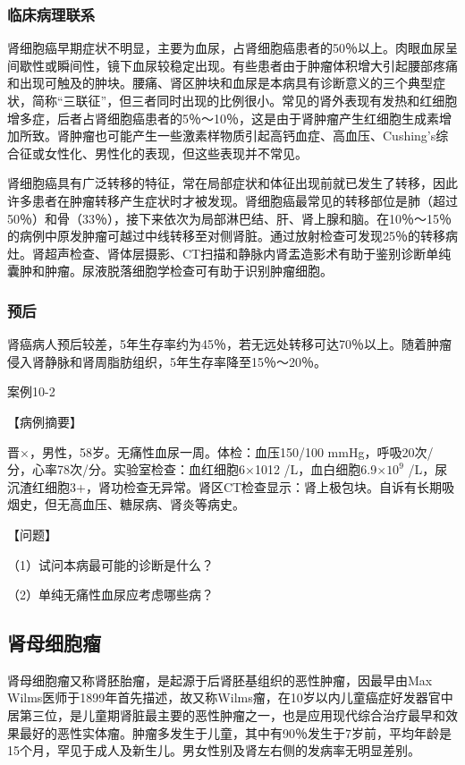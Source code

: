 \subsubsection{临床病理联系}

肾细胞癌早期症状不明显，主要为血尿，占肾细胞癌患者的50％以上。肉眼血尿呈间歇性或瞬间性，镜下血尿较稳定出现。有些患者由于肿瘤体积增大引起腰部疼痛和出现可触及的肿块。腰痛、肾区肿块和血尿是本病具有诊断意义的三个典型症状，简称“三联征”，但三者同时出现的比例很小。常见的肾外表现有发热和红细胞增多症，后者占肾细胞癌患者的5％～10％，这是由于肾肿瘤产生红细胞生成素增加所致。肾肿瘤也可能产生一些激素样物质引起高钙血症、高血压、Cushing's综合征或女性化、男性化的表现，但这些表现并不常见。

肾细胞癌具有广泛转移的特征，常在局部症状和体征出现前就已发生了转移，因此许多患者在肿瘤转移产生症状时才被发现。肾细胞癌最常见的转移部位是肺（超过50％）和骨（33％），接下来依次为局部淋巴结、肝、肾上腺和脑。在10％～15％的病例中原发肿瘤可越过中线转移至对侧肾脏。通过放射检查可发现25％的转移病灶。肾超声检查、肾体层摄影、CT扫描和静脉内肾盂造影术有助于鉴别诊断单纯囊肿和肿瘤。尿液脱落细胞学检查可有助于识别肿瘤细胞。

\subsubsection{预后}

肾癌病人预后较差，5年生存率约为45％，若无远处转移可达70％以上。随着肿瘤侵入肾静脉和肾周脂肪组织，5年生存率降至15％～20％。

\begin{framed}
{案例10-2}

{【病例摘要】}

晋×，男性，58岁。无痛性血尿一周。体检：血压150/100
mmHg，呼吸20次/分，心率78次/分。实验室检查：血红细胞6×10{12}
/L，血白细胞6.9$\times 10^{9}$
/L，尿沉渣红细胞3+，肾功检查无异常。肾区CT检查显示：肾上极包块。自诉有长期吸烟史，但无高血压、糖尿病、肾炎等病史。

{【问题】}

（1）试问本病最可能的诊断是什么？

（2）单纯无痛性血尿应考虑哪些病？
\end{framed}

\subsection{肾母细胞瘤}

肾母细胞瘤又称肾胚胎瘤，是起源于后肾胚基组织的恶性肿瘤，因最早由Max
Wilms医师于1899年首先描述，故又称Wilms瘤，在10岁以内儿童癌症好发器官中居第三位，是儿童期肾脏最主要的恶性肿瘤之一，也是应用现代综合治疗最早和效果最好的恶性实体瘤。肿瘤多发生于儿童，其中有90％发生于7岁前，平均年龄是15个月，罕见于成人及新生儿。男女性别及肾左右侧的发病率无明显差别。

